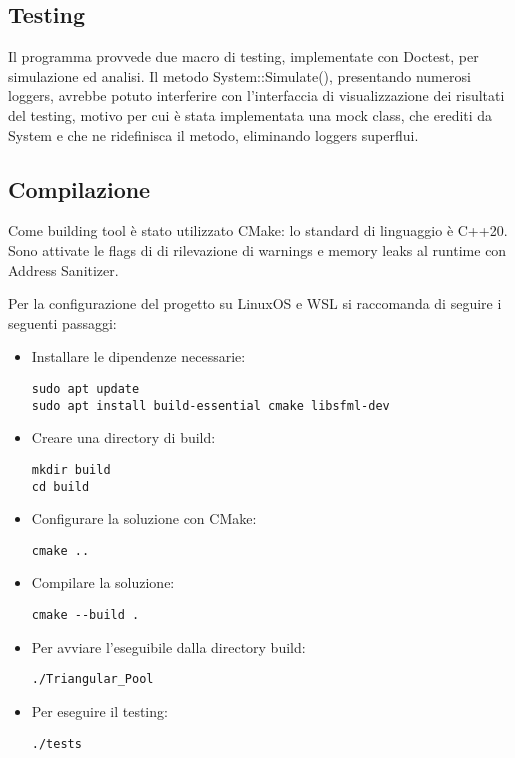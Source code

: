 \documentclass{article}
\begin{document}
\subsection{Testing}

Il programma provvede due macro di testing, implementate con Doctest, per simulazione ed analisi.
Il metodo System::Simulate(), presentando numerosi loggers, avrebbe potuto interferire con l'interfaccia di visualizzazione dei risultati del testing, motivo per cui è stata implementata una mock class, che erediti da System e che ne ridefinisca il metodo, eliminando loggers superflui.

\subsection{Compilazione}
Come building tool è stato utilizzato CMake: lo standard di linguaggio è C++20.
Sono attivate le flags di di rilevazione di warnings e memory leaks al runtime con Address Sanitizer.

Per la configurazione del progetto su LinuxOS e WSL si raccomanda di seguire i seguenti passaggi:

\begin{itemize}
    \item Installare le dipendenze necessarie:
    \begin{lstlisting}[style=wsl]
sudo apt update
sudo apt install build-essential cmake libsfml-dev
\end{lstlisting}

\item Creare una directory di build:
    \begin{lstlisting}[style=wsl]
mkdir build
cd build
\end{lstlisting}

\item Configurare la soluzione con CMake:
    \begin{lstlisting}[style=wsl]
cmake ..
\end{lstlisting}

\item Compilare la soluzione:
    \begin{lstlisting}[style=wsl]
cmake --build .
\end{lstlisting}


\item Per avviare l'eseguibile dalla directory build:
    \begin{lstlisting}[style=wsl]
./Triangular_Pool
\end{lstlisting}

\item Per eseguire il testing:
    \begin{lstlisting}[style=wsl]
./tests
\end{lstlisting}

\end{itemize}
\end{document}
